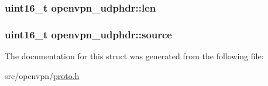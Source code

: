 \subsubsection[{len}]{\setlength{\rightskip}{0pt plus 5cm}uint16\+\_\+t openvpn\+\_\+udphdr\+::len}\label{structopenvpn__udphdr_afe5ff5a9c66a2853169b19d7b4cc37e8}
\hypertarget{structopenvpn__udphdr_a388ec6b6a30d5f208a2c7983e2362e79}{}
\subsubsection[{source}]{\setlength{\rightskip}{0pt plus 5cm}uint16\+\_\+t openvpn\+\_\+udphdr\+::source}\label{structopenvpn__udphdr_a388ec6b6a30d5f208a2c7983e2362e79}


The documentation for this struct was generated from the following file\+:\begin{DoxyCompactItemize}
\item 
src/openvpn/\hyperlink{proto_8h}{proto.\+h}\end{DoxyCompactItemize}
